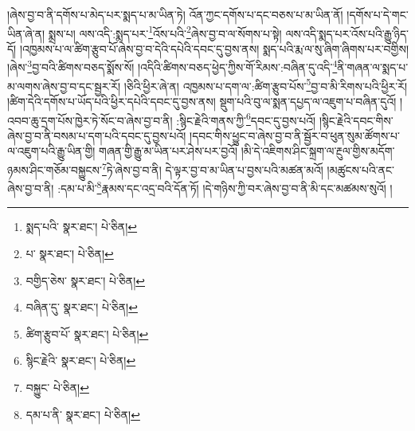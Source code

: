།ཞེས་བྱ་བ་ནི་དགོས་པ་མེད་པར་སྨད་པ་མ་ཡིན་ཏེ། འོན་ཀྱང་དགོས་པ་དང་བཅས་པ་མ་ཡིན་ནོ། །དགོས་པ་དེ་གང་ཡིན་ཞེ་ན། སྨྲས་པ། ལས་འདི་:སྨད་པར་\footnote{སྨད་པའི་  སྣར་ཐང་།  པེ་ཅིན། }འོས་པའི་\footnote{པ་  སྣར་ཐང་།  པེ་ཅིན། }ཞེས་བྱ་བ་ལ་སོགས་པ་སྟེ། ལས་འདི་སྨད་པར་འོས་པའི་རྒྱུ་ཉིད་དོ། །འཁྱམས་པ་ལ་ཚིག་རྩུབ་པོ་ཞེས་བྱ་བ་དེའི་དཔེའི་དབང་དུ་བྱས་ནས། སྨད་པའི་རྨ་ལ་སུ་ཞིག་ཞིགས་པར་བགྱིས། །ཞེས་\footnote{བགྱིད་ཅེས་  སྣར་ཐང་།  པེ་ཅིན། }བྱ་བའི་ཚིགས་བཅད་སྨོས་སོ། །འདིའི་ཚིགས་བཅད་ཕྱེད་ཀྱིས་གོ་རིམས་:བཞིན་དུ་འདི་\footnote{བཞིན་དུ་  སྣར་ཐང་།  པེ་ཅིན། }ནི་གཞན་ལ་སྨད་པ་མ་ལགས་ཞེས་བྱ་བ་དང་སྦྱར་རོ། །ཅིའི་ཕྱིར་ཞེ་ན། འཁྱམས་པ་དག་ལ་:ཚིག་རྩུབ་པོས་\footnote{ཚིག་རྩུབ་པོ་  སྣར་ཐང་།  པེ་ཅིན། }བྱ་བ་མི་རིགས་པའི་ཕྱིར་རོ། །ཚིག་དེའི་དགོས་པ་ཡོད་པའི་ཕྱིར་དཔེའི་དབང་དུ་བྱས་ནས། སྡུག་པའི་བུ་ལ་སྨན་དཔྱད་ལ་འཇུག་པ་བཞིན་དུའོ། །འབབ་ཆུ་དྲག་པོས་ཁྱེར་ཏེ་སོང་བ་ཞེས་བྱ་བ་ནི། :སྙིང་རྗེའི་གནས་ཀྱི་\footnote{སྙིང་རྗེའི་  སྣར་ཐང་།  པེ་ཅིན། }དབང་དུ་བྱས་པའོ། །སྙིང་རྗེའི་དབང་གིས་ཞེས་བྱ་བ་ནི་བསམ་པ་དག་པའི་དབང་དུ་བྱས་པའོ། །དབང་གིས་ཕྱུང་བ་ཞེས་བྱ་བ་ནི་སྦྱོར་བ་ཕུན་སུམ་ཚོགས་པ་ལ་འཇུག་པའི་རྒྱུ་ཡིན་གྱི། གཞན་གྱི་རྒྱུ་མ་ཡིན་པར་ཤེས་པར་བྱའོ། །མི་དེ་འཇིགས་ཤིང་སྐྲག་ལ་རྔུལ་གྱིས་མདོག་ཉམས་ཤིང་གཅོམ་བསྐྱུངས་\footnote{བསྐྱུང་  པེ་ཅིན། }ཏེ་ཞེས་བྱ་བ་ནི། དེ་ལྟར་བྱ་བ་མ་ཡིན་པ་བྱས་པའི་མཚན་མའོ། །མཚུངས་པའི་ནང་ཞེས་བྱ་བ་ནི། :དམ་པ་མི་\footnote{དམ་པ་ནི་  སྣར་ཐང་།  པེ་ཅིན། }རྣམས་དང་འདྲ་བའི་དོན་ཏོ། །དེ་གཉིས་ཀྱི་བར་ཞེས་བྱ་བ་ནི་མི་དང་མཚམས་སུའོ། །
